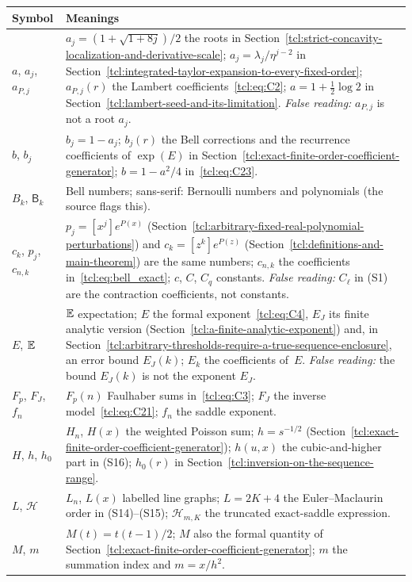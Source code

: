 \noindent\begin{longtable}{@{}>{\raggedright\arraybackslash}p{0.95in}>{\raggedright\arraybackslash}p{5.3in}@{}}
\toprule
Symbol & Meanings\\
\midrule
$a$, $a_j$, $a_{P,j}$ & $a_j=(1+\sqrt{1+8j})/2$ the roots in Section~\ref{tcl:strict-concavity-localization-and-derivative-scale}; $a_j=\lambda_j/\eta^{j-2}$ in Section~\ref{tcl:integrated-taylor-expansion-to-every-fixed-order}; $a_{P,j}(r)$ the Lambert coefficients~\eqref{tcl:eq:C2}; $a=1+\frac12\log2$ in Section~\ref{tcl:lambert-seed-and-its-limitation}. \emph{False reading:} $a_{P,j}$ is not a root $a_j$.\\
$b$, $b_j$ & $b_j=1-a_j$; $b_j(r)$ the Bell corrections and the recurrence coefficients of $\exp(E)$ in Section~\ref{tcl:exact-finite-order-coefficient-generator}; $b=1-a^2/4$ in~\eqref{tcl:eq:C23}.\\
$B_k$, $\mathsf B_k$ & Bell numbers; sans-serif: Bernoulli numbers and polynomials (the source flags this).\\
$c_k$, $p_j$, $c_{n,k}$ & $p_j=[x^j]e^{P(x)}$ (Section~\ref{tcl:arbitrary-fixed-real-polynomial-perturbations}) and $c_k=[z^k]e^{P(z)}$ (Section~\ref{tcl:definitions-and-main-theorem}) are the same numbers; $c_{n,k}$ the coefficients in~\eqref{tcl:eq:bell_exact}; $c$, $C$, $C_q$ constants. \emph{False reading:} $C_\ell$ in (S1) are the contraction coefficients, not constants.\\
$E$, $\mathbb E$ & $\mathbb E$ expectation; $E$ the formal exponent~\eqref{tcl:eq:C4}, $E_J$ its finite analytic version (Section~\ref{tcl:a-finite-analytic-exponent}) and, in Section~\ref{tcl:arbitrary-thresholds-require-a-true-sequence-enclosure}, an error bound $E_J(k)$; $E_k$ the coefficients of~$E$. \emph{False reading:} the bound $E_J(k)$ is not the exponent $E_J$.\\
$F_p$, $F_J$, $f_n$ & $F_p(n)$ Faulhaber sums in~\eqref{tcl:eq:C3}; $F_J$ the inverse model~\eqref{tcl:eq:C21}; $f_n$ the saddle exponent.\\
$H$, $h$, $h_0$ & $H_n$, $H(x)$ the weighted Poisson sum; $h=s^{-1/2}$ (Section~\ref{tcl:exact-finite-order-coefficient-generator}); $h(u,x)$ the cubic-and-higher part in (S16); $h_0(r)$ in Section~\ref{tcl:inversion-on-the-sequence-range}.\\
$L$, $\mathcal H$ & $L_n$, $L(x)$ labelled line graphs; $L=2K+4$ the Euler--Maclaurin order in (S14)--(S15); $\mathcal H_{m,K}$ the truncated exact-saddle expression.\\
$M$, $m$ & $M(t)=t(t-1)/2$; $M$ also the formal quantity of Section~\ref{tcl:exact-finite-order-coefficient-generator}; $m$ the summation index and $m=x/h^2$.\\

\end{longtable}
